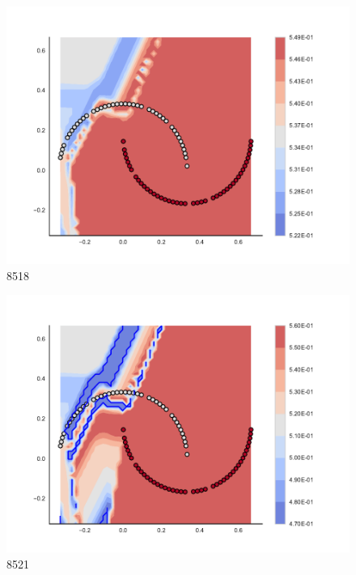 \begin{subfigure}[b]{0.09\textwidth}
    \includegraphics[clip, trim=2.35cm 1.75cm 4.5cm 0cm,width=\textwidth]{img/convergence/8518.pdf}
    \caption{8518}
    \label{fig:convergence_8518}
\end{subfigure}
%
\begin{subfigure}[b]{0.09\textwidth}
    \includegraphics[clip, trim=2.35cm 1.75cm 4.5cm 0cm,width=\textwidth]{img/convergence/8521.pdf}
    \caption{8521}
    \label{fig:convergence_8521}
\end{subfigure}
%

